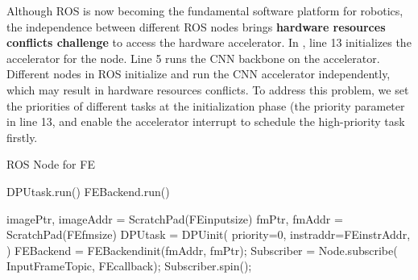 Although ROS is now becoming the fundamental software platform for robotics, the independence between different ROS nodes brings \textbf{hardware resources conflicts challenge} to access the hardware accelerator. 
In , line 13 initializes the accelerator for the node. Line 5 runs the CNN backbone on the accelerator. Different nodes in ROS initialize and run the CNN accelerator independently, which may result in hardware resources conflicts. To address this problem, we set the priorities of different tasks at the initialization phase (the {\color{red}priority} parameter in   line 13, and enable the accelerator interrupt to schedule the high-priority task firstly.



\begin{algorithm}[t]
    \caption{ ROS Node for FE }
    \label{code:FE}
    \begin{algorithmic}[1]
        \State DPUtask.run()
        \State FEBackend.run()
        \EndFunction

        \State imagePtr, imageAddr = ScratchPad(FEinputsize)
        \State fmPtr, fmAddr = ScratchPad(FEfmsize)
        \State DPUtask = DPUinit({\color{red}  priority=0},{\color{blue} instraddr=FEinstrAddr, }
        \State \qquad \qquad \qquad {} ) 
        \State FEBackend = FEBackendinit({\color{blue}fmAddr, fmPtr});
        \State Subscriber = Node.subscribe( InputFrameTopic, FEcallback);
        \State Subscriber.spin();
        \EndFunction
    \end{algorithmic}
\end{algorithm}

